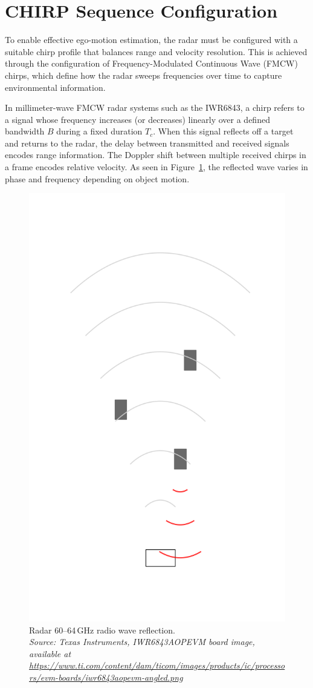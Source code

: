\section{CHIRP Sequence Configuration}

\label{sec:chirp-theory}

To enable effective ego-motion estimation, the radar must be configured with a suitable chirp profile that balances range and velocity resolution.
This is achieved through the configuration of Frequency-Modulated Continuous Wave (FMCW) chirps, which define how the radar sweeps frequencies over time to capture environmental information.

In millimeter-wave FMCW radar systems such as the IWR6843, a chirp refers to a signal whose frequency increases (or decreases) linearly over a defined bandwidth $B$ during a fixed duration $T_c$.
When this signal reflects off a target and returns to the radar, the delay between transmitted and received signals encodes range information.
The Doppler shift between multiple received chirps in a frame encodes relative velocity.  
As seen in Figure~\ref{fig:radarWavePropagation}, the reflected wave varies in phase and frequency depending on object motion.


\begin{figure}[!htbp]
    \centering
    \includegraphics[width=0.5\linewidth]{images/radarWave.png}
    \caption{Radar 60–64\,GHz radio wave reflection.\\
    \textit{Source: Texas Instruments, IWR6843AOPEVM board image, available at \url{https://www.ti.com/content/dam/ticom/images/products/ic/processors/evm-boards/iwr6843aopevm-angled.png}}}
    \label{fig:radarWavePropagation}
\end{figure}


